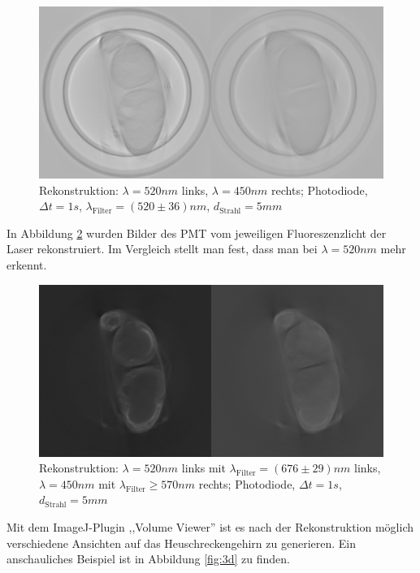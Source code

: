 \begin{figure}[ht]
\centering
\includegraphics[width=\linewidth]{IMAGE/2-pht.png}
\caption{Rekonstruktion: $\lambda = 520 \si{nm}$ links, $\lambda = 450 \si{nm}$ rechts; Photodiode, $\Delta{t} = 1 \si{s}$, $\lambda_\text{Filter} = (520 \pm 36) \si{nm}$, $d_\text{Strahl} = 5 \si{mm}$}
	\label{fig:both-pht}
\end{figure}

In Abbildung \ref{fig:both-pmt} wurden Bilder des PMT vom jeweiligen Fluoreszenzlicht der Laser rekonstruiert. Im Vergleich stellt man fest, dass man bei $\lambda= 520 \si{nm}$ mehr erkennt.

\begin{figure}[ht]
\centering
\includegraphics[width=\linewidth]{IMAGE/2-pmt.png}
\caption{Rekonstruktion: $\lambda = 520 \si{nm}$ links mit $\lambda_\text{Filter} = (676 \pm 29) \si{nm}$ links, $\lambda = 450 \si{nm}$ mit $\lambda_\text{Filter} \ge 570 \si{nm}$ rechts; Photodiode, $\Delta{t} = 1 \si{s}$, $d_\text{Strahl} = 5 \si{mm}$}
	\label{fig:both-pmt}
\end{figure}

Mit dem ImageJ-Plugin ,,Volume Viewer'' ist es nach der Rekonstruktion möglich verschiedene Ansichten auf das Heuschreckengehirn zu generieren. Ein anschauliches Beispiel ist in Abbildung \ref{fig:3d} zu finden.

